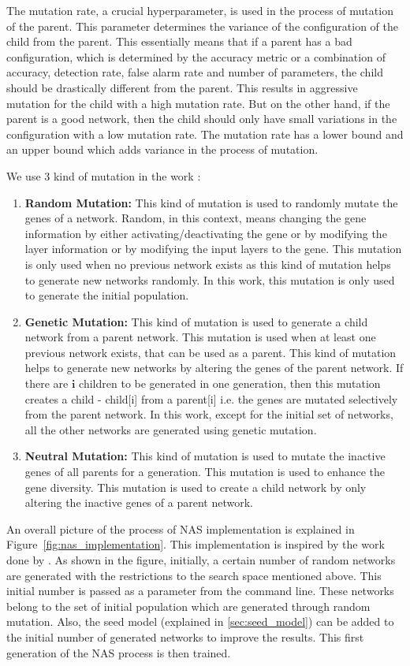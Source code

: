 The mutation rate, a crucial hyperparameter, is used in the process of mutation of the parent. This parameter determines the variance of the configuration of the child from the parent. This essentially means that if a parent has a bad configuration, which is determined by the accuracy metric or a combination of accuracy, detection rate, false alarm rate and number of parameters, the child should be drastically different from the parent. This results in aggressive mutation for the child with a high mutation rate. But on the other hand, if the parent is a good network, then the child should only have small variations in the configuration with a low mutation rate. The mutation rate has a lower bound and an upper bound which adds variance in the process of mutation.

We use 3 kind of mutation in the work :

\begin{enumerate}
    \item \textbf{Random Mutation:} This kind of mutation is used to randomly mutate the genes of a network. Random, in this context, means changing the gene information by either activating/deactivating the gene or by modifying the layer information or by modifying the input layers to the gene. This mutation is only used when no previous network exists as this kind of mutation helps to generate new networks randomly. In this work, this mutation is only used to generate the initial population.
    \item \textbf{Genetic Mutation:} This kind of mutation is used to generate a child network from a parent network. This mutation is used when at least one previous network exists, that can be used as a parent. This kind of mutation helps to generate new networks by altering the genes of the parent network. If there are $\textbf{i}$ children to be generated in one generation, then this mutation creates a child - child[i] from a parent[i] i.e. the genes are mutated selectively from the parent network. In this work, except for the initial set of networks, all the other networks are generated using genetic mutation.
    \item \textbf{Neutral Mutation:} This kind of mutation is used to mutate the inactive genes of all parents for a generation. This mutation is used to enhance the gene diversity. This mutation is used to create a child network by only altering the inactive genes of a parent network. 
\end{enumerate}

An overall picture of the process of NAS implementation is explained in Figure~\ref{fig:nas_implementation}. This implementation is inspired by the work done by \cite{sun2020automatically}. As shown in the figure, initially, a certain number of random networks are generated with the restrictions to the search space mentioned above. This initial number is passed as a parameter from the command line. These networks belong to the set of initial population which are generated through random mutation. Also, the seed model (explained in \autoref{sec:seed_model}) can be added to the initial number of generated networks to improve the results. This first generation of the NAS process is then trained.

